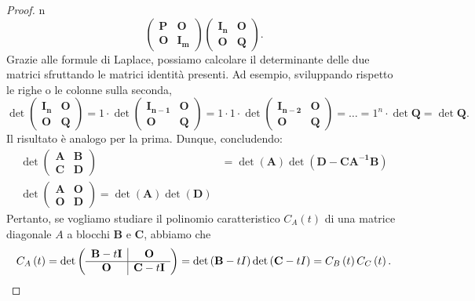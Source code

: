 \begin{proof}{n}
\begin{equation*}
	\left(
	\begin{array}{c|c}
		\mathbf{P} & \mathbf{O}\\
		\hline
		\mathbf{O} & \mathbf{I_m}
	\end{array}
	\right)\left(
	\begin{array}{c|c}
		\mathbf{I_n} & \mathbf{O}\\
		\hline
		\mathbf{O} & \mathbf{Q}
	\end{array}
	\right).
\end{equation*}
Grazie alle formule di Laplace, possiamo calcolare il determinante delle due matrici sfruttando le matrici identità presenti. Ad esempio, sviluppando rispetto le righe o le colonne sulla seconda,
\begin{equation*}
\det\left(
\begin{array}{c|c}
	\mathbf{I_n} & \mathbf{O}\\
	\hline
	\mathbf{O} & \mathbf{Q}
\end{array}
\right)=1\cdot \det\left(
\begin{array}{c|c}
	\mathbf{I_{n-1}} & \mathbf{O}\\
	\hline
	\mathbf{O} & \mathbf{Q}
\end{array}
\right)=1\cdot 1\cdot \det\left(
\begin{array}{c|c}
	\mathbf{I_{n-2}} & \mathbf{O}\\
	\hline
	\mathbf{O} & \mathbf{Q}
\end{array}
\right)=\ldots = 1^n\cdot \det \mathbf{Q} =\det \mathbf{Q}.
\end{equation*}
Il risultato è analogo per la prima. Dunque, concludendo:
\begin{align*}
\det\left(
\begin{array}{c|c}
	\mathbf{A} & \mathbf{B}\\
	\hline
	\mathbf{C} & \mathbf{D}
\end{array}
\right)&=\det\left(\mathbf{A}\right)\det\left(\mathbf{D-CA^{-1}B}\right)\\
\det\left(
\begin{array}{c|c}
	\mathbf{A} & \mathbf{O}\\
	\hline
	\mathbf{O} & \mathbf{D}
\end{array}
\right)=\det\left(\mathbf{A}\right)\det\left(\mathbf{D}\right)
\end{align*}
Pertanto, se vogliamo studiare il polinomio caratteristico $C_A\left(t\right)$ di una matrice diagonale $A$ a blocchi $\mathbf{B}$ e $\mathbf{C}$, abbiamo che
\begin{equation*}
C_A\left(t\right)=\det\left(
\begin{array}{c|c}
	\mathbf{B}-t\mathbf{I} & \mathbf{O}\\
	\hline
	\mathbf{O} & \mathbf{C}-t\mathbf{I}
\end{array}
\right)=\det\left(\mathbf{B}-t I\right)\det\left(\mathbf{C}-t I\right)=C_B\left(t\right)C_C\left(t\right).\qedhere
\end{equation*}
\end{proof}

